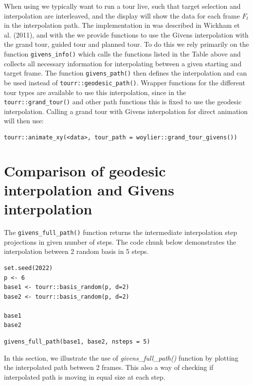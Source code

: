 When using  we typically want to run a tour live, such that target selection and interpolation are interleaved, and the display will show the data for each frame \(F_t\) in the interpolation path. The implementation in  was described in Wickham et al. (2011), and with the  we provide functions to use the Givens interpolation with the grand tour, guided tour and planned tour. To do this we rely primarily on the function \texttt{givens\_info()} which calls the functions listed in the Table above and collects all necessary information for interpolating between a given starting and target frame. The function \texttt{givens\_path()} then defines the interpolation and can be used instead of \texttt{tourr::geodesic\_path()}. Wrapper functions for the different tour types are available to use this interpolation, since in the \texttt{tourr::grand\_tour()} and other path functions this is fixed to use the geodesic interpolation. Calling a grand tour with Givens interpolation for direct animation will then use:

\begin{verbatim}
tourr::animate_xy(<data>, tour_path = woylier::grand_tour_givens())
\end{verbatim}

\hypertarget{comparison-of-geodesic-interpolation-and-givens-interpolation}{%
\section{Comparison of geodesic interpolation and Givens interpolation}\label{comparison-of-geodesic-interpolation-and-givens-interpolation}}

The \texttt{givens\_full\_path()} function returns the intermediate interpolation step projections in given number of steps. The code chunk below demonstrates the interpolation between 2 random basis in 5 steps.

\begin{verbatim}
set.seed(2022)
p <- 6
base1 <- tourr::basis_random(p, d=2)
base2 <- tourr::basis_random(p, d=2)

base1
base2
\end{verbatim}

\begin{verbatim}
givens_full_path(base1, base2, nsteps = 5)
\end{verbatim}

In this section, we illustrate the use of \emph{givens\_full\_path()} function by plotting the interpolated path between 2 frames. This also a way of checking if interpolated path is moving in equal size at each step.

